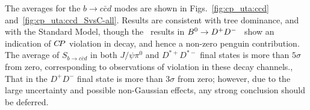 The averages for the $b \to c\bar c d$ modes 
are shown in Figs.~\ref{fig:cp_uta:ccd} and~\ref{fig:cp_uta:ccd_SvsC-all}.
Results are consistent with tree dominance,
and with the Standard Model,
though the \belle\ results in $B^0 \to D^+D^-$~\cite{Fratina:2007zk}
show an indication of $C\!P$ violation in decay,
and hence a non-zero penguin contribution.
The average of $S_{b \to c\bar c d}$ in both $J/\psi \pi^{0}$ and
$D^{*+}D^{*-}$ final states is more than $5\sigma$ from zero, corresponding to
observations of \CP violation in these decay channels.,
That in the $D^+D^-$ final state is more than $3\sigma$ from zero;
however, due to the large uncertainty and possible non-Gaussian effects,
any strong conclusion should be deferred.


